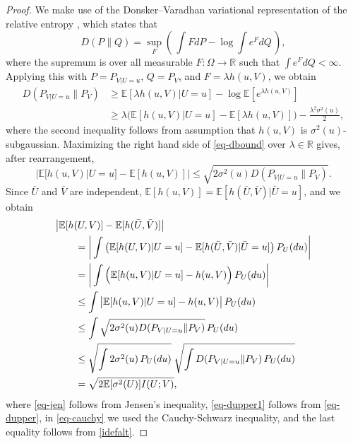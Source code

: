 \documentclass[11pt]{article}
\def\R{{\mathbb R}}
\def\EXP {{\mathbb E}}
\begin{document}
\begin{proof}
We make use of the Donsker–Varadhan variational representation of the relative entropy \cite[Corollary~4.15]{BuLuMa13}, which states that 
\[
D(P\|Q) = \sup_F \left(  \, \int F dP - \log \int e^F dQ \, \right),
\]
where the supremum is over all measurable $F:\Omega\to \R$ such that $\int e^FdQ    <\infty$. Applying this with $P=P_{V|U=u}$, $Q=P_V$, and $F=\lambda h(u,V)$, we obtain
\begin{align}
D(P_{V|U=u}\|P_V) 
&\ge 
\EXP[\lambda h(u,V)|U=u]- \log \EXP[e^{\lambda h(u,V)}]      \nonumber \\
& \ge  
\lambda\big( \EXP[ h(u,V)|U=u]- \EXP[\lambda h(u,V)] \big) -\frac{\lambda^2\sigma^2(u)}{2}, \label{eq-dbound}
\end{align}
where the second inequality follows from assumption that  $h(u,V)$ is $\sigma^2(u)$-subgaussian.  Maximizing the right hand side of  \eqref{eq-dbound} over  $\lambda\in \R$ gives, after rearrangement, 
\begin{equation}
 \label{eq-dupper}   
 \big| \EXP[ h(u,V)|U=u]- \EXP[ h(u,V)] | \le 
 \sqrt{2 \sigma^2(u)  D(P_{V|U=u}\|P_V)}. 
\end{equation}
Since $\bar{U}$ and $\bar{V}$ are independent,  $ \EXP[ h(u,V)]= \EXP[h(\bar{U},\bar{V})|\bar{U}=u]$, and we obtain 
\begin{align}
\MoveEqLeft \big| \EXP[h(U,V)] - \EXP[h(\bar{U},\bar{V})] \big|\nonumber  \\
&=
\bigg| \int \big( \EXP[h(U,V)|U=u] -\EXP[ h(\bar{U},\bar{V})|\bar{U}=u]\big) \,P_U(du) \bigg| \nonumber \\
&= \bigg| \int \Big( \EXP[h(u,V)|U=u] - h(u,V) \Big) \,P_U(du) \bigg| \nonumber \\
&\le \int \big| \EXP[h(u,V)|U=u] - h(u,V) \big|  \,P_U(du)   \label{eq-jen}\\
&\le  \int \sqrt{2 \sigma^2(u)  D(P_{V|U=u}\|P_V)}  \,P_U(du)  \label{eq-dupper1}   \\
&\le  \sqrt{ \int 2 \sigma^2(u) \,P_U(du)  } \; \sqrt{ \int  D(P_{V|U=u}\|P_V)  \,P_U(du)}    \label{eq-cauchy} \\
&= \sqrt{2 \EXP[\sigma^2(U)] I(U;V)},  
\end{align}
where \eqref{eq-jen} follows from Jensen's inequality, \eqref{eq-dupper1}   follows from \eqref{eq-dupper},  in \eqref{eq-cauchy} we used the Cauchy-Schwarz inequality, and the last equality follows from \eqref{idefalt}. 


\end{proof}
\end{document}
